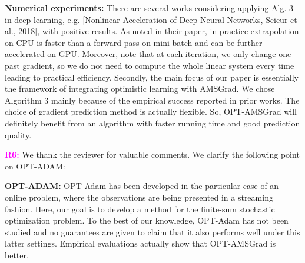 \documentclass{article}
\begin{document}
\textbf{Numerical experiments:} There are several works considering applying Alg. 3 in deep learning, e.g. [Nonlinear Acceleration of Deep Neural Networks, Scieur et al., 2018], with positive results. 
As noted in their paper, in practice extrapolation on CPU is faster than a forward pass on mini-batch and can be further accelerated on GPU. 
Moreover, note that at each iteration, we only change one past gradient, so we do not need to compute the whole linear system every time leading to practical efficiency. 
Secondly, the main focus of our paper is essentially the framework of integrating optimistic learning with AMSGrad. 
We chose Algorithm 3 mainly because of the empirical success reported in prior works. The choice of gradient prediction method is actually flexible. 
So, OPT-AMSGrad will definitely benefit from an algorithm with faster running time and good prediction quality. 


\vspace{0.01in}

\textbf{\textcolor{magenta}{R6:}} We thank the reviewer for valuable comments. We clarify the following point on OPT-ADAM:\vspace{-5pt}

\textbf{OPT-ADAM:} OPT-Adam has been developed in the particular case of an online problem, where the observations are being presented in a streaming fashion. Here, our goal is to develop a method for the finite-sum stochastic optimization problem. To the best of our knowledge, OPT-Adam has not been studied and no guarantees are given to claim that it also performs well under this latter settings. Empirical evaluations actually show that OPT-AMSGrad is better.
\end{document}
